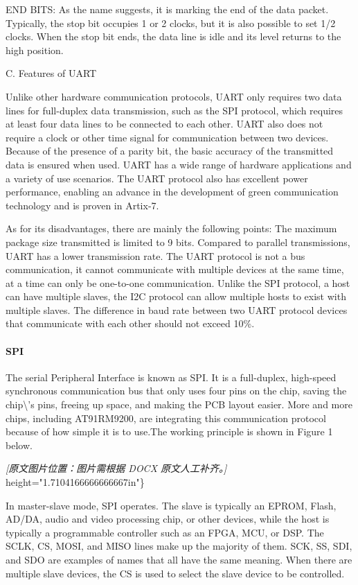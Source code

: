 \documentclass[12pt,a4paper]{article}
\numberwithin{equation}{section}
\begin{document}
    END BITS: As the name suggests, it is marking the end of the data
    packet. Typically, the stop bit occupies 1 or 2 clocks, but it is
    also possible to set 1/2 clocks. When the stop bit ends, the data
    line is idle and its level returns to the high position.

C.  Features of UART

    Unlike other hardware communication protocols, UART only requires
    two data lines for full-duplex data transmission, such as the SPI
    protocol, which requires at least four data lines to be connected to
    each other. UART also does not require a clock or other time signal
    for communication between two devices. Because of the presence of a
    parity bit, the basic accuracy of the transmitted data is ensured
    when used. UART has a wide range of hardware applications and a
    variety of use scenarios. The UART protocol also has excellent power
    performance, enabling an advance in the development of green
    communication technology and is proven in Artix-7.

    As for its disadvantages, there are mainly the following points: The
    maximum package size transmitted is limited to 9 bits. Compared to
    parallel transmissions, UART has a lower transmission rate. The UART
    protocol is not a bus communication, it cannot communicate with
    multiple devices at the same time, at a time can only be one-to-one
    communication. Unlike the SPI protocol, a host can have multiple
    slaves, the I2C protocol can allow multiple hosts to exist with
    multiple slaves. The difference in baud rate between two UART
    protocol devices that communicate with each other should not exceed
    10\%.

\paragraph{SPI}

The serial Peripheral Interface is known as SPI. It is a full-duplex,
high-speed synchronous communication bus that only uses four pins on the
chip, saving the chip\textbackslash{}'s pins, freeing up space, and making the PCB
layout easier. More and more chips, including AT91RM9200, are
integrating this communication protocol because of how simple it is to
use.The working principle is shown in Figure 1 below.

\noindent\textit{[原文图片位置：图片需根据 DOCX 原文人工补齐。]}
height="1.7104166666666667in"\}

In master-slave mode, SPI operates. The slave is typically an EPROM,
Flash, AD/DA, audio and video processing chip, or other devices, while
the host is typically a programmable controller such as an FPGA, MCU, or
DSP. The SCLK, CS, MOSI, and MISO lines make up the majority of them.
SCK, SS, SDI, and SDO are examples of names that all have the same
meaning. When there are multiple slave devices, the CS is used to select
the slave device to be controlled.
\end{document}
